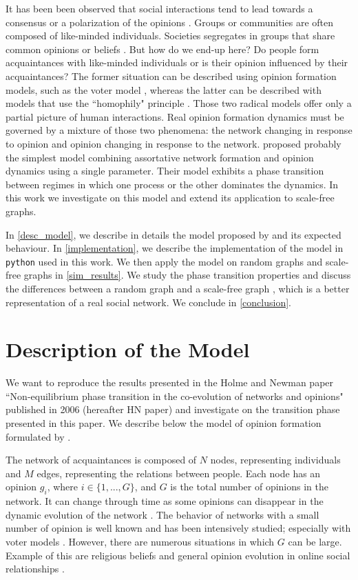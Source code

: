 \documentclass[11pt]{article}
\begin{document}
It has been been observed that social interactions tend to lead towards a consensus or a polarization of the opinions \citep{Consensus, Proskurnikov2016}. Groups or communities are often composed of like-minded individuals. Societies segregates in groups that share common opinions or beliefs \citep{DiPrete2011}. But how do we end-up here? Do people form acquaintances with like-minded individuals or is their opinion influenced by their acquaintances? The former situation can be described using opinion formation models, such as the voter model \citep{Castellano, Sood2005}, whereas the latter can be described with models that use the ``homophily" principle \citep{homophily, homophily_Kiesner}. Those two radical models offer only a partial picture of human interactions. Real opinion formation dynamics must be governed by a mixture of those two phenomena: the network changing in response to opinion and opinion changing in response to the network. \citet{Holme2006} proposed probably the simplest model combining assortative network formation and opinion dynamics using a single parameter. Their model exhibits a phase transition between regimes in which one process or the other dominates the dynamics. In this work we investigate on this model and extend its application to scale-free graphs.

In \autoref{desc_model}, we describe in details the model proposed by \citet{Holme2006} and its expected behaviour. In \autoref{implementation}, we describe the implementation of the model in \texttt{python} used in this work. We then apply the model on random graphs and scale-free graphs in \autoref{sim_results}. We study the phase transition properties and discuss the differences between a random graph and a scale-free graph \citep{Fan2002_Scale-Free_graph}, which is a better representation of a real social network. We conclude in \autoref{conclusion}.

\section{Description of the Model}
\label{desc_model}
We want to reproduce the results presented in the Holme and Newman paper ``Non-equilibrium phase transition in the co-evolution of networks and opinions" published in 2006 (hereafter HN paper) and investigate on the transition phase presented in this paper. We describe below the model of opinion formation formulated by \cite{Holme2006}.

The network of acquaintances is composed of $N$ nodes, representing individuals and $M$ edges, representing the relations between people. Each node has an opinion $g_i$, where $i\in\{1, ..., G\}$, and $G$ is the total number of opinions in the network. It can change through time as some opinions can disappear in the dynamic evolution of the network \citep{Fu2008}. The behavior of networks with a small number of opinion is well known and has been intensively studied; especially with voter models \citep{Castellano, Sood2005, FernandezGracia2014}. However, there are numerous situations in which $G$ can be large. Example of this are religious beliefs \citep{Religious_Belief} and general opinion evolution in online social relationships \citep{Goh2006}.
\end{document}
